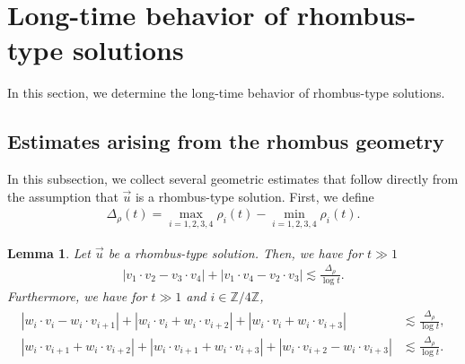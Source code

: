 \documentclass[10pt,a4paper]{amsart}
\newtheorem{lemma}[theorem]{Lemma}
\numberwithin{equation}{section}
\begin{document}
\section{Long-time behavior of rhombus-type solutions}

In this section,  we determine the long-time behavior of rhombus-type solutions.


\subsection{Estimates arising from the rhombus geometry}

In this subsection, we collect several geometric estimates that follow directly from the assumption that $\vec{u}$ is a rhombus-type solution. First, we define
\begin{align}\label{sadef}
\Delta_{\rho}(t)=\max_{i=1,2,3,4}\rho_i(t)-\min_{i=1,2,3,4}\rho_i(t).
\end{align}



\begin{lemma}\label{hishinaisekilem1}
Let $\vec{u}$ be a rhombus-type solution. Then, we have for $t\gg 1$
\begin{align}\label{naisekirhombes}
\left|v_1\cdot v_2-v_3\cdot v_4\right|+\left|v_1\cdot v_4-v_2\cdot v_3\right|\lesssim \frac{\Delta_{\rho}}{\log{t}}.
\end{align}
Furthermore, we have for $t\gg 1$ and $i\in\mathbb{Z}/4\mathbb{Z}$,
\begin{align}\label{naisekirhombes2}
\begin{aligned}
\left|w_i\cdot v_i-w_i\cdot v_{i+1}\right|+\left|w_i\cdot v_i+w_i\cdot v_{i+2}\right|+\left|w_i\cdot v_i+w_i\cdot v_{i+3}\right|&\lesssim \frac{\Delta_{\rho}}{\log{t}},
\\
\left|w_i\cdot v_{i+1}+w_i\cdot v_{i+2}\right|+\left|w_i\cdot v_{i+1}+w_i\cdot v_{i+3}\right|+\left|w_i\cdot v_{i+2}-w_i\cdot v_{i+3}\right|&\lesssim \frac{\Delta_{\rho}}{\log{t}}.
\end{aligned}
\end{align}
\end{lemma}
\end{document}
